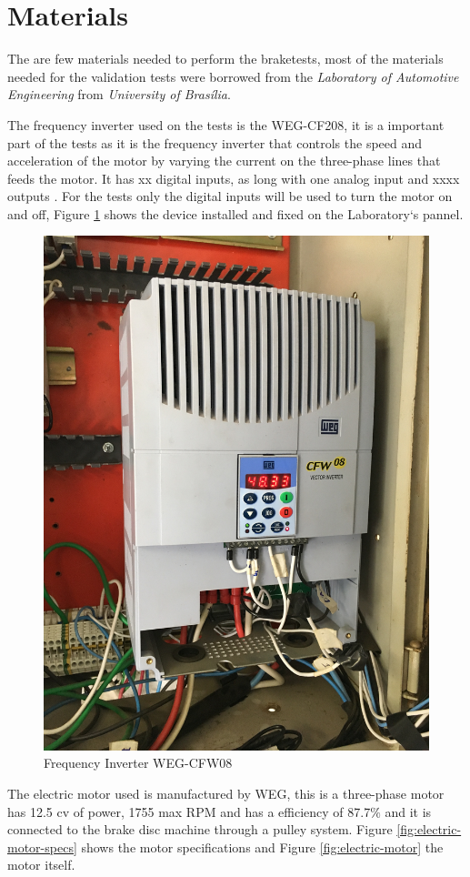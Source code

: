 \section{Materials}\label{sec:materials}
		The are few materials needed to perform the braketests, most of the materials needed for the validation tests were borrowed from the \textit{Laboratory of Automotive Engineering} from \textit{University of Brasília}.
		\par
		The frequency inverter used on the tests is the WEG-CF208, it is a important part of the tests as it is the frequency inverter that controls the speed and acceleration of the motor by varying the current on the three-phase lines that feeds the motor. It has xx digital inputs, as long with one analog input and xxxx outputs \cite{weg-CFW08}. For the tests only the digital inputs will be used to turn the motor on and off, Figure \ref{fig:frequency-inverter} shows the device installed and fixed on the Laboratory`s pannel.

		\begin{figure}[htbp]
			\centering
			\includegraphics[width=.7\textwidth, angle=270]{figuras/fig-frequency-inverter}
			\caption{Frequency Inverter WEG-CFW08}
			\label{fig:frequency-inverter}
		\end{figure}
		\par

		The electric motor used is manufactured by WEG, this is a three-phase motor has 12.5 cv of power, 1755 max RPM and has a efficiency of 87.7$\%$ and it is connected to the brake disc machine through a pulley system. Figure \ref{fig:electric-motor-specs} shows the motor specifications and Figure \ref{fig:electric-motor} the motor itself.

